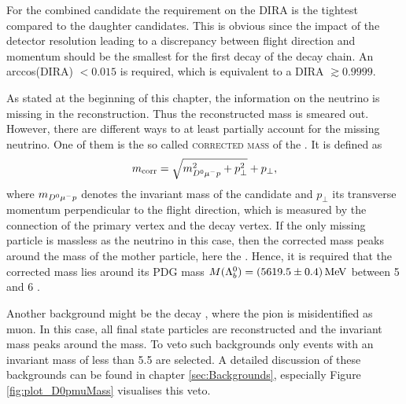 For the combined \Dz\mun\proton candidate the requirement on the DIRA is the tightest compared to the daughter candidates.
This is obvious since the impact of the detector resolution leading to a discrepancy between flight direction and momentum should be the smallest for the first decay of the decay chain.
An arccos(DIRA) $< 0.015$ is required, which is equivalent to a DIRA $\gtrsim 0.9999$.

As stated at the beginning of this chapter, the information on the neutrino is missing in the reconstruction.
Thus the reconstructed \Lb mass is smeared out.
However, there are different ways to at least partially account for the missing neutrino.
One of them is the so called \textsc{corrected mass} of the \Lb.
It is defined as
\begin{align}
    m_{\text{corr}} = \sqrt{m_{{{D}^0}{\mu^-}{p}}^2 + p_{\perp}^2} + p_{\perp}, \label{eq:correctedMass}
\end{align}
where $m_{{{D}^0}{\mu^-}{p}}$ denotes the invariant mass of the \Dz\mun\proton candidate and $p_\perp$ its transverse momentum perpendicular to the \Lb flight direction, which is measured by the connection of the primary vertex and the \Lb decay vertex.
If the only missing particle is massless as the neutrino in this case, then the corrected mass peaks around the mass of the mother particle, here the \Lb \cite{CorrectedMass}.
Hence, it is required that the corrected \Lb mass lies around its PDG mass $M({{\Lambda}^0_{b}})=(5619.5 \pm 0.4)\mathrm{\,Me\kern -0.1em V}$ \cite{PDG} between 5 and 6 \gev.

Another background might be the decay \decay{\Lb}{\Dz\proton\pim}, where the pion is misidentified as muon.
In this case, all final state particles are reconstructed and the invariant \Dz\mun\proton mass peaks around the \Lb mass.
To veto such backgrounds only events with an invariant \Dz\mun\proton mass of less than 5.5 \gev are selected.
A detailed discussion of these backgrounds can be found in chapter \ref{sec:Backgrounds}, especially Figure \ref{fig:plot_D0pmuMass} visualises this veto.


